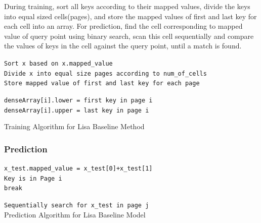 During training, sort all keys according to their mapped values, divide the keys into equal sized cells(pages), and store the mapped values of first and last key for each cell into an array. For prediction, find the cell corresponding to mapped value of query point using binary search, scan this cell sequentially and compare the values of keys in the cell against the query point, until a match is found. 

\begin{algorithm}[H]
    \SetAlgoLined
     \texttt{Sort x based on x.mapped\_value}\\
     \texttt{Divide x into equal size pages according to num\_of\_cells}\\
     \texttt{Store mapped value of first and last key for each page }\\
     {
         \texttt{denseArray[i].lower = first key in page i  } \\
		 \texttt{denseArray[i].upper = last key in page i  }
		
     }
     \caption{Training Algorithm for Lisa Baseline Method}
     \label{Training_Lisa_Baseline}
\end{algorithm}

\subsubsection{Prediction}

\begin{algorithm}[H]
    \SetAlgoLined
    \texttt{x\_test.mapped\_value = x\_test[0]+x\_test[1] } \\
    {
        {
		    \texttt{Key is in Page i } \\
		    \texttt{break }
		}
    }
  
 	 \texttt{Sequentially search for x\_test in page j} \\
     \caption{Prediction Algorithm for Lisa Baseline Model }
\end{algorithm}

